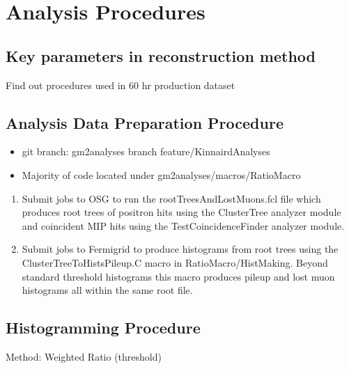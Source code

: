 \chapter{Analysis Procedures}


\section{Key parameters in reconstruction method}

Find out procedures used in 60 hr production dataset


\section{Analysis Data Preparation Procedure}

\begin{itemize}
	\item{git branch: gm2analyses branch feature/KinnairdAnalyses}
	\item{Majority of code located under gm2analyses/macros/RatioMacro}
\end{itemize}

\begin{enumerate}
	\item{Submit jobs to OSG to run the rootTreesAndLostMuons.fcl file which produces root trees of positron hits using the ClusterTree analyzer module and coincident MIP hits using the TestCoincidenceFinder analyzer module.}
	\item{Submit jobs to Fermigrid to produce histograms from root trees using the ClusterTreeToHistsPileup.C macro in RatioMacro/HistMaking. Beyond standard threshold histograms this macro produces pileup and lost muon histograms all within the same root file.}
\end{enumerate}


\section{Histogramming Procedure}

Method: Weighted Ratio (threshold)

